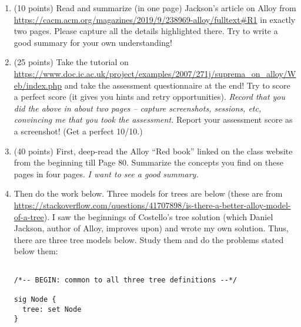\documentclass[11pt]{article}
\begin{document}
\begin{enumerate}

\item (10 points)
  Read and summarize (in one page) Jackson's article on Alloy
  from \url{https://cacm.acm.org/magazines/2019/9/238969-alloy/fulltext#R1}
  in exactly two pages. Please capture all the details highlighted there.
  Try to write a good summary for your own understanding!

  
\begin{minipage}{\minpagw}
\end{minipage}  
  

\item (25 points)
  Take the tutorial on
  \url{https://www.doc.ic.ac.uk/project/examples/2007/271j/suprema_on_alloy/Web/index.php}
  and take the assessment questionnaire at the end! Try to score a perfect score (it gives you
  hints and retry opportunities).
  {\em Record that you did the above in about two pages -- capture screenshots, sessions, etc, convincing
    me that you took the assessment.} Report your assessment score as a screenshot! (Get a perfect 10/10.)

\item (40 points)
  First, deep-read the Alloy ``Red book'' linked on the class website
  from the beginning till Page 80.
  Summarize the concepts you find on these pages in four pages.
  {\em I want to see a good summary.}
  \item[] Then do the work below.
    Three models for trees are below (these
  are from
  \url{https://stackoverflow.com/questions/41707898/is-there-a-better-alloy-model-of-a-tree}).
  I saw the beginnings of Costello's tree solution (which Daniel Jackson, author of Alloy, improves upon) and wrote
  my own solution.
  Thus, there are three tree models below.
  Study them and do the problems stated below them:
  \begin{scriptsize}
\begin{verbatim}

/*-- BEGIN: common to all three tree definitions --*/

sig Node {
  tree: set Node
}


\end{verbatim}
\end{scriptsize}
\end{enumerate}
\end{document}
